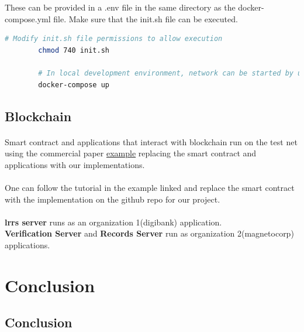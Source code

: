 \documentclass{article}
\begin{document}
        These can be provided in a .env file in the same directory as the docker-compose.yml file.
        Make sure that the init.sh file can be executed.
    
        \begin{lstlisting}[language=bash, caption=IPFS]
        # Modify init.sh file permissions to allow execution
        chmod 740 init.sh
        
        # In local development environment, network can be started by using the command:-
        docker-compose up
        \end{lstlisting}
    
        \subsection{Blockchain}
    
        \paragraph{}
        Smart contract and applications that interact with blockchain run on the test net using the commercial paper \href{https://hyperledger-fabric.readthedocs.io/en/latest/tutorial/commercial_paper.html}{example} replacing the smart contract and applications with our implementations.
        
        \paragraph{}
        One can follow the tutorial in the example linked and replace the smart contract with the implementation on the github repo for our project.\\
        \\
        \textbf{\gls{lrrs} server} runs as an organization 1(digibank) application.\\
        \textbf{Verification Server} and \textbf{Records Server} run as organization 2(magnetocorp) applications.
    

    \section{Conclusion}
        \subsection{Conclusion}
\end{document}
